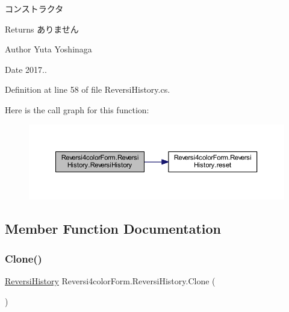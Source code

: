 コンストラクタ 

\begin{DoxyReturn}{Returns}
ありません 
\end{DoxyReturn}
\begin{DoxyAuthor}{Author}
Yuta Yoshinaga 
\end{DoxyAuthor}
\begin{DoxyDate}{Date}
2017.. 
\end{DoxyDate}


Definition at line 58 of file Reversi\+History.\+cs.

Here is the call graph for this function\+:\nopagebreak
\begin{figure}[H]
\begin{center}
\leavevmode
\includegraphics[width=350pt]{class_reversi4color_form_1_1_reversi_history_a90caf6857e6bae3a51be28ac48cd7d70_cgraph}
\end{center}
\end{figure}


\subsection{Member Function Documentation}
\mbox{\label{class_reversi4color_form_1_1_reversi_history_aaa0fdae109a1965a1dec3632119950bd}} 
\subsubsection{\texorpdfstring{Clone()}{Clone()}}
{\footnotesize\ttfamily \hyperlink{class_reversi4color_form_1_1_reversi_history}{Reversi\+History} Reversi4color\+Form.\+Reversi\+History.\+Clone (\begin{DoxyParamCaption}{ }\end{DoxyParamCaption})}



